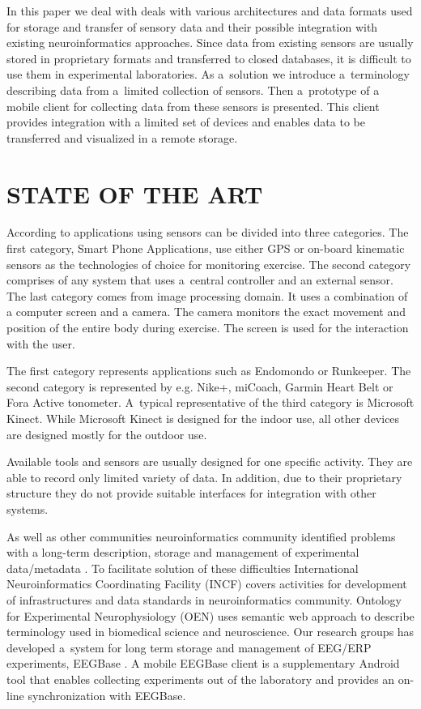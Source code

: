 \documentclass[a4paper,twoside]{article}
\begin{document}
In this paper we deal with deals with various architectures and data formats used for storage and transfer of sensory data and their possible integration with existing neuroinformatics approaches. Since data from existing sensors are usually stored in proprietary formats and transferred to closed databases, it is difficult to use them in experimental laboratories. As a~solution we introduce a~terminology describing data from a~limited collection of sensors. Then a~prototype of a mobile client for collecting data from these sensors is presented. This client provides integration with a limited set of devices and enables data to be transferred and visualized in a remote storage.

\section{\uppercase{state of the art}}
\label{sec:state-of-the-art}

\noindent
According to \cite{Lowe2012242} applications using sensors can be divided into three categories. The first category, Smart Phone Applications, use either GPS or 
on-board kinematic sensors as the technologies of choice for monitoring exercise. The second category comprises of any system that uses a~central controller
and an external sensor. The last category comes from image processing domain. It uses a combination of a computer screen and a camera. The camera monitors the exact movement and position of the entire body during exercise. The screen is used for the interaction with the user.

The first category represents applications such as Endomondo or Runkeeper. The second category is represented by e.g. Nike+, miCoach, Garmin Heart Belt or Fora Active tonometer. A~typical representative of the third category is Microsoft Kinect. While Microsoft Kinect is designed for the indoor use, all other devices are designed mostly for the outdoor use.

Available tools and sensors are usually designed for one specific activity. They are able to record only limited variety of data. In addition, due to their proprietary structure they do not provide suitable interfaces for integration with other systems.

As well as other communities neuroinformatics community identified problems with a long-term description, storage and management of experimental data/metadata \cite{CRCNS}. To facilitate solution of these difficulties International Neuroinformatics Coordinating Facility (INCF) \cite{INCF} covers activities for development of infrastructures and data standards in neuroinformatics community. Ontology for Experimental Neurophysiology (OEN) \cite{10.3389/conf.fninf.2014.18.00044} uses semantic web approach to describe terminology used in biomedical science and neuroscience.  Our research groups has developed a~system for long term storage and management of EEG/ERP experiments, EEGBase \cite{ISI:000306821100004}. A mobile EEGBase client \cite{10.3389/conf.fninf.2013.09.00046} is a supplementary Android tool that enables collecting experiments out of the laboratory and provides an on-line synchronization with EEGBase.
\end{document}

